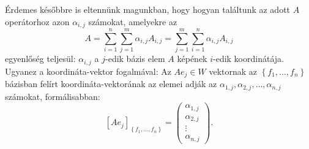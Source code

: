 \documentclass[a4paper, showtrims]{memoir}
\theoremstyle{plain}
\theoremstyle{remark}
\theoremstyle{definition}
\begin{document}
Érdemes későbbre is eltennünk magunkban,
hogy hogyan találtunk az adott $A$ operátorhoz azon $\alpha_{i,j}$ számokat,
amelyekre az
\[
	A=
	\sum_{i=1}^n\sum_{j=1}^m\alpha_{i,j}A_{i,j}
	=
	\sum_{j=1}^m\sum_{i=1}^n\alpha_{i,j}A_{i,j}
\]
egyenlőség teljesül:
$\alpha_{i,j}$ a $j$-edik bázis elem $A$ képének $i$-edik koordinátája.
Ugyanez a koordináta-vektor fogalmával:
Az $Ae_j\in W$ vektornak az $\left\{ f_1,\ldots,f_n \right\}$ bázisban felírt koordináta-vektorának az elemei
adják az $\alpha_{1,j},\alpha_{2,j},\ldots,\alpha_{n,j}$ számokat, formálisabban:
\[
	\left[ Ae_j \right]_{\left\{ f_1,\ldots,f_n \right\}}
	=
	\begin{pmatrix}
		\alpha_{1,j} \\ \alpha_{2,j}\\ \vdots \\ \alpha_{n,j}
	\end{pmatrix}.
\]
\end{document}
